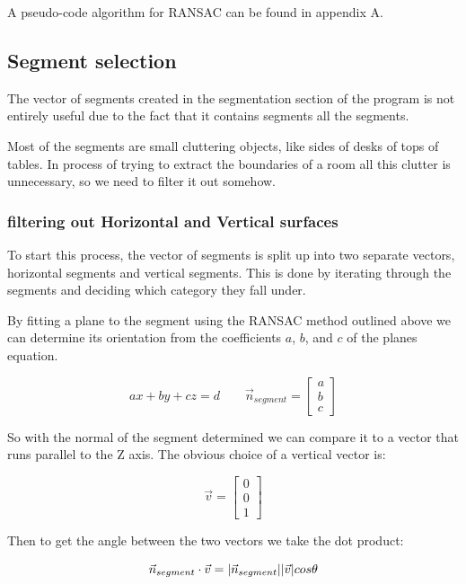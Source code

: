 			
			A pseudo-code algorithm for RANSAC can be found in appendix A.
		\subsection{Segment selection}
			The vector of segments created in the segmentation section of the program is not entirely useful due to the fact that it contains segments all the segments.
			
			Most of the segments are small cluttering objects, like sides of desks of tops of tables. In process of trying to extract the boundaries of a room all this clutter is unnecessary, so we need to filter it out somehow.
			
			\subsubsection{filtering out Horizontal and Vertical surfaces}
				To start this process, the vector of segments is split up into two separate vectors, horizontal segments and vertical segments. This is done by iterating through the segments and deciding which category they fall under.
				
				By fitting a plane to the segment using the RANSAC method outlined above we can determine its orientation from the coefficients $a$, $b$, and $c$ of the planes equation.
				
				\begin{equation}
				ax + by + cz = d  \quad\quad
				\vec{n}_{segment} = \begin{bmatrix}a\\b\\c\end{bmatrix}
				\end{equation}
				
				So with the normal of the segment determined we can compare it to a vector that runs parallel to the Z axis. The obvious choice of a vertical vector is:
				
				\begin{equation}
				\vec{v} = \begin{bmatrix}0\\0\\1\end{bmatrix}
				\end{equation}
				
				Then to get the angle between the two vectors we take the dot product:
				
				\begin{equation}
				\vec{n}_{segment}\cdot \vec{v} = \lvert \vec{n}_{segment} \rvert \lvert \vec{v} \rvert cos \theta
				\end{equation}
				
